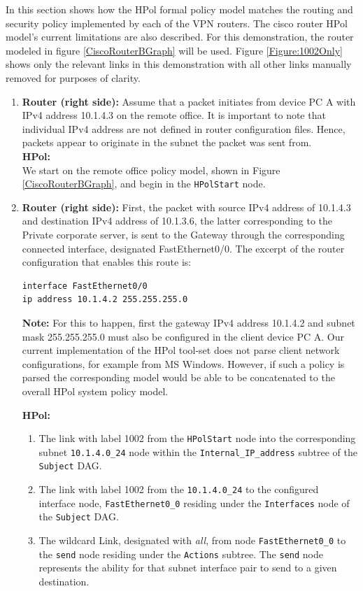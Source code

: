 \documentclass[12pt,letterpaper]{report}
\newcommand{\node}[1]{\texttt{#1}}
\newcommand{\tbf}[1]{\textbf{#1}}
\begin{document}
In this section shows how the HPol formal policy model matches the routing and security policy implemented by each of the VPN routers. The cisco router HPol model's current limitations are also described. For this demonstration, the router modeled in figure \ref{CiscoRouterBGraph} will be used. Figure \ref{Figure:1002Only} shows only the relevant links in this demonstration with all other links manually removed for purposes of clarity.

\begin{enumerate}
	\item%
	{%
		{\tbf{Router (right side):} Assume that a packet initiates from device PC A with IPv4 address 10.1.4.3 on the remote office. It is important to note that individual IPv4 address are not defined in router configuration files. Hence, packets appear to originate in the subnet the packet was sent from.}\\
		{\tbf{HPol:}\\ We start on the remote office policy model, shown in Figure {\ref{CiscoRouterBGraph}}, and begin in the {\node{HPolStart}} node.}
	}
	\item%
	{%
		{\tbf{Router (right side):} First, the packet with source IPv4 address of 10.1.4.3 and destination IPv4 address of 10.1.3.6, the latter corresponding to the Private corporate server, is sent to the Gateway through the corresponding connected interface, designated FastEthernet0/0. The excerpt of the router configuration that enables this route is:}
		\begin{lstlisting}[style=hermes]
interface FastEthernet0/0
ip address 10.1.4.2 255.255.255.0
		\end{lstlisting}
		{\tbf{Note:} For this to happen, first the gateway IPv4 address 10.1.4.2 and subnet mask 255.255.255.0 must also be configured in the client device PC A. Our current implementation of the HPol tool-set does not parse client network configurations, for example from MS Windows. However, if such a policy is parsed the corresponding model would be able to be concatenated to the overall HPol system policy model.}
		
		{\tbf{HPol:}}
		\begin{enumerate}		
			\item {The link with label 1002 from the {\node{HPolStart}} node into the corresponding subnet {\node{10.1.4.0\_24}} node within the {\node{Internal\_IP\_address}} subtree of the \texttt{Subject} DAG.}
			\item {The link with label 1002 from the {\node{10.1.4.0\_24}} to the configured interface node, {\node{FastEthernet0\_0}} residing under the {\node{Interfaces}} node of the \texttt{Subject} DAG.}
			\item {The wildcard Link, designated with \textit{all}, from node {\node{FastEthernet0\_0}} to the {\node{send}} node residing under the {\node{Actions}} subtree. The {\node{send}} node represents the ability for that subnet interface pair to send to a given destination.}
			

\end{enumerate}}
\end{enumerate}
\end{document}
